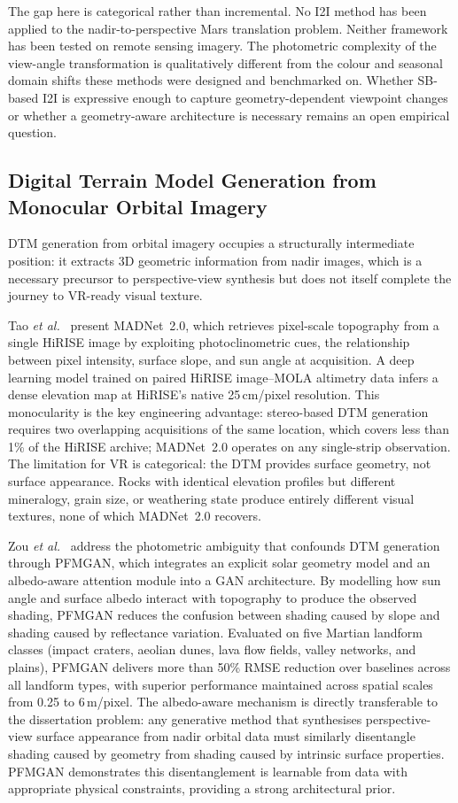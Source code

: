 \documentclass[10pt,journal]{IEEEtran}
\begin{document}
The gap here is categorical rather than incremental. No I2I method has been
applied to the nadir-to-perspective Mars translation problem. Neither framework
has been tested on remote sensing imagery. The photometric complexity of the
view-angle transformation is qualitatively different from the colour and seasonal
domain shifts these methods were designed and benchmarked on. Whether SB-based
I2I is expressive enough to capture geometry-dependent viewpoint changes or
whether a geometry-aware architecture is necessary remains an open empirical
question.

\subsection{Digital Terrain Model Generation from Monocular Orbital Imagery}
\label{subsec:dtm}

DTM generation from orbital imagery occupies a structurally intermediate
position: it extracts 3D geometric information from nadir images, which is a
necessary precursor to perspective-view synthesis but does not itself complete
the journey to VR-ready visual texture.

Tao \textit{et al.}~\cite{tao2021madnet} present MADNet~2.0, which retrieves
pixel-scale topography from a single HiRISE image by exploiting photoclinometric
cues, the relationship between pixel intensity, surface slope, and sun angle
at acquisition. A deep learning model trained on paired HiRISE image--MOLA
altimetry data infers a dense elevation map at HiRISE's native 25\,cm/pixel
resolution. This monocularity is the key engineering advantage: stereo-based
DTM generation requires two overlapping acquisitions of the same location, which
covers less than 1\% of the HiRISE archive; MADNet~2.0 operates on any
single-strip observation. The limitation for VR is categorical: the DTM provides
surface geometry, not surface appearance. Rocks with identical elevation profiles
but different mineralogy, grain size, or weathering state produce entirely
different visual textures, none of which MADNet~2.0 recovers.

Zou \textit{et al.}~\cite{zou2026pfmgan} address the photometric ambiguity
that confounds DTM generation through PFMGAN, which integrates an explicit solar
geometry model and an albedo-aware attention module into a GAN architecture. By
modelling how sun angle and surface albedo interact with topography to produce
the observed shading, PFMGAN reduces the confusion between shading caused by
slope and shading caused by reflectance variation. Evaluated on five Martian
landform classes (impact craters, aeolian dunes, lava flow fields, valley
networks, and plains), PFMGAN delivers more than 50\% RMSE reduction over
baselines across all landform types, with superior performance maintained across
spatial scales from 0.25 to 6\,m/pixel. The albedo-aware mechanism is directly
transferable to the dissertation problem: any generative method that synthesises
perspective-view surface appearance from nadir orbital data must similarly
disentangle shading caused by geometry from shading caused by intrinsic surface
properties. PFMGAN demonstrates this disentanglement is learnable from data
with appropriate physical constraints, providing a strong architectural prior.
\end{document}
